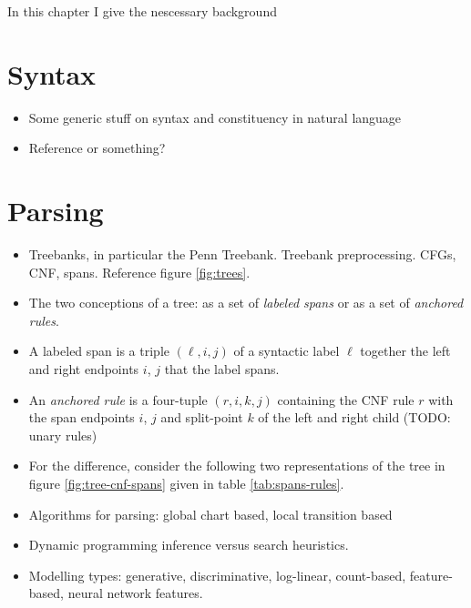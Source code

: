 % 

In this chapter I give the nescessary background

\section{Syntax}
\begin{itemize}
  \item Some generic stuff on syntax and constituency in natural language
  \item Reference \citep{Carnie2010:constituent,Everaert+2015:structures} or something?
\end{itemize}

\section{Parsing}
\begin{itemize}
  \item Treebanks, in particular the Penn Treebank. Treebank preprocessing. CFGs, CNF, spans. Reference figure \ref{fig:trees}.
  \item The two conceptions of a tree: as a set of \textit{labeled spans} or as a set of \textit{anchored rules}.
  \item A labeled span is a triple $(\ell, i, j)$ of a syntactic label $\ell$ together the left and right endpoints $i$, $j$ that the label spans.
  \item An \textit{anchored rule} is a four-tuple $(r, i, k, j)$ containing the CNF rule $r$ with the span endpoints $i$, $j$ and split-point $k$ of the left and right child (TODO: unary rules)
  \item For the difference, consider the following two representations of the tree in figure \ref{fig:tree-cnf-spans} given in table \ref{tab:spans-rules}.
  \item Algorithms for parsing: global chart based, local transition based
  \item Dynamic programming inference versus search heuristics.
  \item Modelling types: generative, discriminative, log-linear, count-based, feature-based, neural network features.
\end{itemize}

